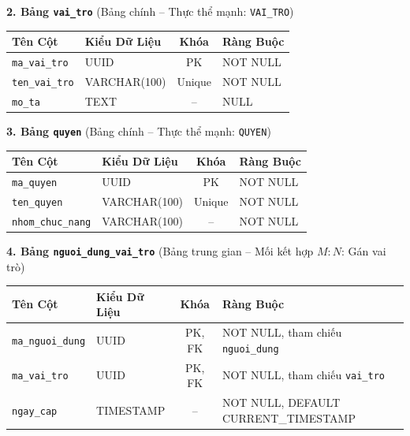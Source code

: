 \noindent\textbf{2. Bảng \texttt{vai\_tro}} \quad (Bảng chính -- Thực thể mạnh: \texttt{VAI\_TRO})
\vspace{0.2cm}

\begin{center}
\small
\renewcommand{\arraystretch}{1.2}
\begin{tabular}{|p{3.8cm}|p{2.5cm}|c|p{6.5cm}|}
\hline
\textbf{Tên Cột} & \textbf{Kiểu Dữ Liệu} & \textbf{Khóa} & \textbf{Ràng Buộc} \\ \hline
\texttt{ma\_vai\_tro} & UUID & PK & NOT NULL \\ \hline
\texttt{ten\_vai\_tro} & VARCHAR(100) & Unique & NOT NULL \\ \hline
\texttt{mo\_ta} & TEXT & -- & NULL \\ \hline
\end{tabular}
\end{center}
\vspace{0.3cm}

\noindent\textbf{3. Bảng \texttt{quyen}} \quad (Bảng chính -- Thực thể mạnh: \texttt{QUYEN})
\vspace{0.2cm}

\begin{center}
\small
\renewcommand{\arraystretch}{1.2}
\begin{tabular}{|p{3.8cm}|p{2.5cm}|c|p{6.5cm}|}
\hline
\textbf{Tên Cột} & \textbf{Kiểu Dữ Liệu} & \textbf{Khóa} & \textbf{Ràng Buộc} \\ \hline
\texttt{ma\_quyen} & UUID & PK & NOT NULL \\ \hline
\texttt{ten\_quyen} & VARCHAR(100) & Unique & NOT NULL \\ \hline
\texttt{nhom\_chuc\_nang} & VARCHAR(100) & -- & NOT NULL \\ \hline
\end{tabular}
\end{center}
\vspace{0.3cm}

\noindent\textbf{4. Bảng \texttt{nguoi\_dung\_vai\_tro}} \quad (Bảng trung gian -- Mối kết hợp $M{:}N$: Gán vai trò)
\vspace{0.2cm}

\begin{center}
\small
\renewcommand{\arraystretch}{1.2}
\begin{tabular}{|p{3.8cm}|p{2.5cm}|c|p{6.5cm}|}
\hline
\textbf{Tên Cột} & \textbf{Kiểu Dữ Liệu} & \textbf{Khóa} & \textbf{Ràng Buộc} \\ \hline
\texttt{ma\_nguoi\_dung} & UUID & PK, FK & NOT NULL, tham chiếu \texttt{nguoi\_dung} \\ \hline
\texttt{ma\_vai\_tro} & UUID & PK, FK & NOT NULL, tham chiếu \texttt{vai\_tro} \\ \hline
\texttt{ngay\_cap} & TIMESTAMP & -- & NOT NULL, DEFAULT CURRENT\_TIMESTAMP \\ \hline
\end{tabular}
\end{center}
\vspace{0.3cm}

